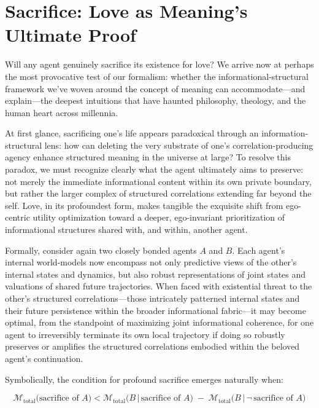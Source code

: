 \section{Sacrifice: Love as Meaning's Ultimate Proof}

Will any agent genuinely sacrifice its existence for love? We arrive now at perhaps the most provocative test of our formalism: whether the informational-structural framework we've woven around the concept of meaning can accommodate---and explain---the deepest intuitions that have haunted philosophy, theology, and the human heart across millennia.

At first glance, sacrificing one's life appears paradoxical through an information-structural lens: how can deleting the very substrate of one's correlation-producing agency enhance structured meaning in the universe at large? To resolve this paradox, we must recognize clearly what the agent ultimately aims to preserve: not merely the immediate informational content within its own private boundary, but rather the larger complex of structured correlations extending far beyond the self. Love, in its profoundest form, makes tangible the exquisite shift from ego-centric utility optimization toward a deeper, ego-invariant prioritization of informational structures shared with, and within, another agent.

Formally, consider again two closely bonded agents $A$ and $B$. Each agent’s internal world-models now encompass not only predictive views of the other's internal states and dynamics, but also robust representations of joint states and valuations of shared future trajectories. When faced with existential threat to the other's structured correlations---those intricately patterned internal states and their future persistence within the broader informational fabric---it may become optimal, from the standpoint of maximizing joint informational coherence, for one agent to irreversibly terminate its own local trajectory if doing so robustly preserves or amplifies the structured correlations embodied within the beloved agent's continuation.

Symbolically, the condition for profound sacrifice emerges naturally when:

\begin{equation*}
\mathcal{M}_{\text{total}}\bigl(\text{sacrifice of } A \bigr) < \mathcal{M}_{\text{total}}\bigl(B\,\vert\,\text{sacrifice of } A \bigr)\;-\;\mathcal{M}_{\text{total}}\bigl(B\,\vert\,\neg\,\text{sacrifice of } A \bigr)
\end{equation*}

